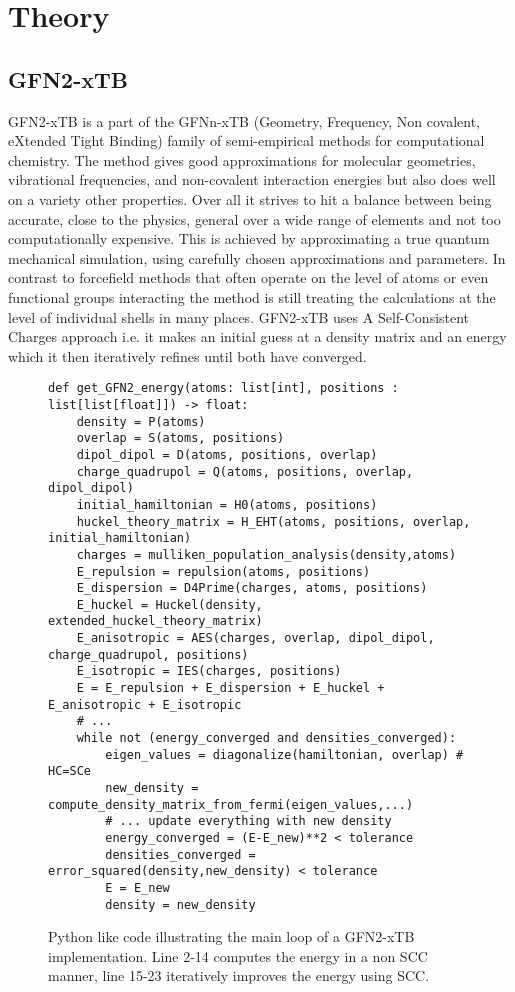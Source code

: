\section{Theory}
\subsection{GFN2-xTB}
GFN2-xTB is a part of the GFNn-xTB (Geometry, Frequency, Non covalent, eXtended Tight Binding) family of semi-empirical methods for computational chemistry. 
The method gives good approximations for molecular geometries, vibrational frequencies, and non-covalent interaction energies but also does well on a variety other properties. 
Over all it strives to hit a balance between being accurate, close to the physics, general over a wide range of elements and not too computationally expensive.
This is achieved by approximating a true quantum mechanical simulation, using carefully chosen approximations and parameters. 
In contrast to forcefield methods that often operate on the level of atoms or even functional groups interacting the method is still treating the calculations at the level of individual shells in many places. 
GFN2-xTB uses A Self-Consistent Charges approach i.e. it makes an initial guess at a density matrix and an energy which it then iteratively refines until both have converged. 

\begin{figure}[H]
\begin{verbatim}
def get_GFN2_energy(atoms: list[int], positions : list[list[float]]) -> float:
    density = P(atoms)
    overlap = S(atoms, positions)
    dipol_dipol = D(atoms, positions, overlap)
    charge_quadrupol = Q(atoms, positions, overlap, dipol_dipol)
    initial_hamiltonian = H0(atoms, positions)
    huckel_theory_matrix = H_EHT(atoms, positions, overlap, initial_hamiltonian)
    charges = mulliken_population_analysis(density,atoms)
    E_repulsion = repulsion(atoms, positions)
    E_dispersion = D4Prime(charges, atoms, positions)
    E_huckel = Huckel(density, extended_huckel_theory_matrix)
    E_anisotropic = AES(charges, overlap, dipol_dipol, charge_quadrupol, positions)
    E_isotropic = IES(charges, positions)
    E = E_repulsion + E_dispersion + E_huckel + E_anisotropic + E_isotropic
    # ...
    while not (energy_converged and densities_converged):
        eigen_values = diagonalize(hamiltonian, overlap) # HC=SCe 
        new_density = compute_density_matrix_from_fermi(eigen_values,...)
        # ... update everything with new density
        energy_converged = (E-E_new)**2 < tolerance
        densities_converged = error_squared(density,new_density) < tolerance
        E = E_new
        density = new_density
\end{verbatim}
\caption{Python like code illustrating the main loop of a GFN2-xTB implementation.
Line 2-14 computes the energy in a non SCC manner, line 15-23 iteratively improves the energy using SCC.
}
\end{figure}

